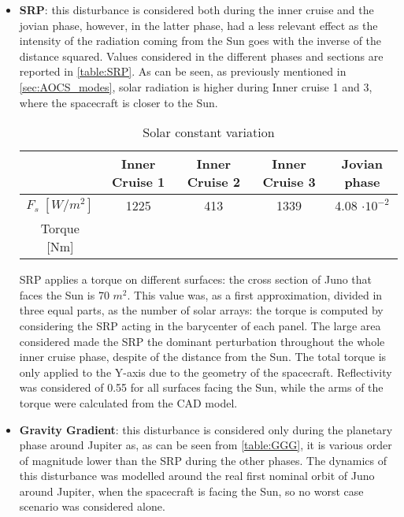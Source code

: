 \begin{itemize}
    \item \textbf{SRP}: this disturbance is considered both during the inner cruise and the jovian phase, however, in the latter phase, had a less relevant effect as the intensity of the radiation coming from the Sun goes with the inverse of the distance squared. Values considered in the different phases and sections are reported in \autoref{table:SRP}. As can be seen, as previously mentioned in \autoref{sec:AOCS_modes}, solar radiation is higher during Inner cruise 1 and 3, where the spacecraft is closer to the Sun. 
    
    \begin{table}[H]
        \renewcommand{\arraystretch}{1.3}
        \centering
        \begin{tabular}{|c|c|c|c|c|}
            \hline
            &\textbf{Inner Cruise 1} & \textbf{Inner Cruise 2} & \textbf{Inner Cruise 3} & \textbf{Jovian phase} \\
            \hline
            \hline
            $F_{s} \; [W/m^2]$ & 1225 & 413 & 1339 & 4.08 $\cdot 10^{-2}$ \\
            \hline
            Torque [Nm] & & & & \\
            \hline
        \end{tabular}
        \caption{Solar constant variation}
        \label{table:SRP}
    \end{table}

    SRP applies a torque on different surfaces: the cross section of Juno that faces the Sun is 70 $m^2$. This value was, as a first approximation, divided in three equal parts, as the number of solar arrays: the torque is computed by considering the SRP acting in the barycenter of each panel. The large area considered made the SRP the dominant perturbation throughout the whole inner cruise phase, despite of the distance from the Sun. The total torque is only applied to the Y-axis due to the geometry of the spacecraft. Reflectivity was considered of 0.55 for all surfaces facing the Sun, while the arms of the torque were calculated from the CAD model. 

    \item \textbf{Gravity Gradient}: this disturbance is considered only during the planetary phase around Jupiter as, as can be seen from \autoref{table:GGG}, it is various order of magnitude lower than the SRP during the other phases.  The dynamics of this disturbance was modelled around the real first nominal orbit of Juno around Jupiter, when the spacecraft is facing the Sun, so no worst case scenario was considered alone.   %
    

\end{itemize}
